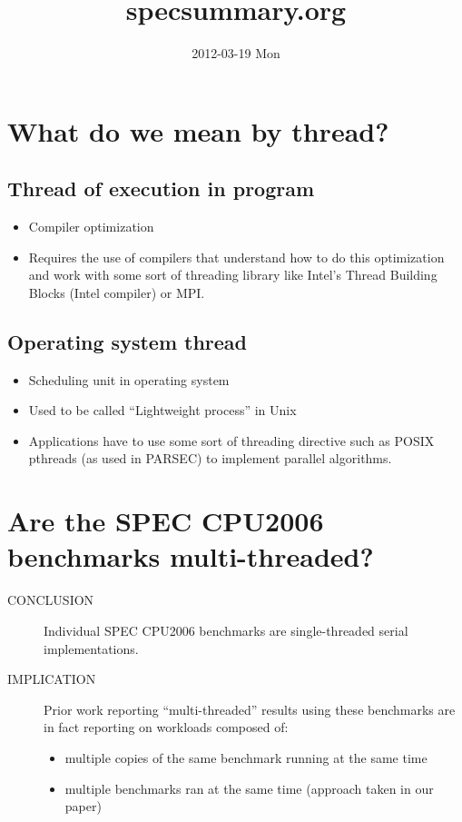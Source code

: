 \documentclass[11pt]{article}
\title{specsummary.org}
\author{}
\date{2012-03-19 Mon}
\begin{document}
\maketitle

\setcounter{tocdepth}{3}
\tableofcontents
\vspace*{1cm}

\section{What do we mean by thread?}
\label{sec-1}
\subsection{Thread of execution in program}
\label{sec-1-1}

\begin{itemize}
\item Compiler optimization
\item Requires the use of compilers that understand how to do this
     optimization and work with some sort of threading library like
     Intel's Thread Building Blocks (Intel compiler) or MPI.
\end{itemize}
\subsection{Operating system thread}
\label{sec-1-2}

\begin{itemize}
\item Scheduling unit in operating system
\item Used to be called ``Lightweight process'' in Unix
\item Applications have to use some sort of threading directive such as
     POSIX pthreads (as used in PARSEC) to implement parallel algorithms.
\end{itemize}
\section{Are the SPEC CPU2006 benchmarks multi-threaded?}
\label{sec-2}

\begin{description}
\item[CONCLUSION] Individual SPEC CPU2006 benchmarks are single-threaded
                  serial implementations.
\item[IMPLICATION] Prior work reporting ``multi-threaded'' results using
                   these benchmarks are in fact reporting on workloads
                   composed of:
\begin{itemize}
\item multiple copies of the same benchmark running at
      the same time
\item multiple benchmarks ran at the same time (approach taken in our paper)
\end{itemize}
\end{description}
\end{document}
